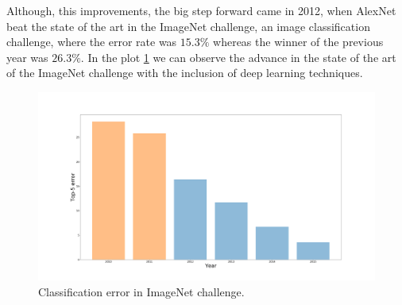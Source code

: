 \documentclass[12pt, a4paper, titlepage,twoside,openright]{article}
\begin{document}



%
%
%



Although, this improvements, the big step forward came in 2012, when AlexNet \cite{alexnet} beat the state of the art in the ImageNet challenge, an image classification challenge, where the error rate was $15.3 \%$ whereas the winner of the previous year was $26.3 \%$. In the plot \ref{intro2} we can observe the advance in the state of the art of the ImageNet challenge with the inclusion of deep learning techniques.




\begin{figure}[H]
\centering         
\includegraphics[width=0.7\linewidth]{intro/iamgeWihtou.png}
\caption{Classification error in ImageNet challenge.} \label{intro2}
\end{figure}
\end{document}
